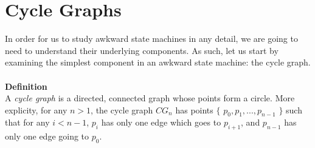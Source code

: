 \documentclass[a4paper,12pt]{article}
\begin{document}
\section{Cycle Graphs}
In order for us to study awkward state machines in any detail, we are going to need to understand their underlying components. As such, let us start by examining the simplest component in an awkward state machine: the cycle graph.
\\
\\
\textbf{Definition}\\
A \textit{cycle graph} is a directed, connected graph whose points form a circle. More explicity, for any $n > 1$, the cycle graph $CG_n$ has points $\{$ $p_0, p_1, ..., p_{n-1}$ $\}$ such that for any $i < n - 1$, $p_i$ has only one edge which goes to $p_{i + 1}$, and $p_{n-1}$ has only one edge going to $p_0$.\\
\\ 
\end{document}
